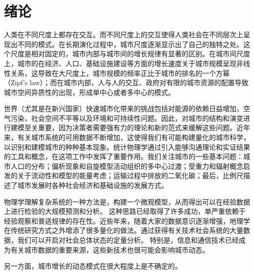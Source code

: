 \chapter{绪论}
人类在不同尺度上都存在交互。而不同尺度上的交互使得人类社会在不同层次上呈现出不同的模式。在长期演化过程中，城市尺度逐渐显示出了自己的独特之处。这个尺度是相对固定的，城市内部与城市间的增长规律有显著的区别。在城市间尺度上，城市的在经济、人口、基础设施建设等方面的增长速度关于城市规模呈现非线性关系，这导致在大尺度上，城市规模的频率正比于城市的排名的一个方幂（Zipf's law）；而在城市内部，人与人的交互、政府对有限的城市资源的配置导致城市空间异质性的出现，形成单中心或者多中心的模式。

世界（尤其是在新兴国家）快速城市化带来的挑战包括对能源的依赖日益增加，空气污染，社会空间不平等以及环境和可持续性问题。因此，对城市的结构和演变进行建模至关重要，因为决策者需要强有力的理论和新的范式来缓解这些问题。近年来，有关城市系统的可用数据不断增加，这使得我们有可能构建量化的城市科学，以识别和建模城市的种种基本现象。统计物理学通过引入能够沟通理论和实证结果的工具和概念，在这项工作中发挥了重要作用。我们关注城市的一些基本问题：城市人口的分布；偏析现象和自旋模型活动组织的多中心过渡；受重力和辐射概念启发的关于流动性和模型的能量考虑；运输过程中排放的二氧化碳；最后，比例尺描述了城市发展时各种社会经济和基础设施的发展方式。



物理学理解复杂系统的一种方法是，构建一个微观模型，从而得出可以在经验数据上进行检验的大规模预测和分析。 这种思路已经取得了许多成功，单严重依赖于经验观察和普适规律的存在性。近些年来，随着大家的数据意识逐渐增强，地理学在传统研究方式之外增添了很多量化的做法。通过获得有关技术社会系统的大量数据，我们可以开启对社会总体状态的定量分析。 特别是，信息和通信技术已经成为有关城市数据的重要来源，这些新技术也很可能会影响城市动态。

另一方面，城市增长的动态模式在很大程度上是不确定的。

